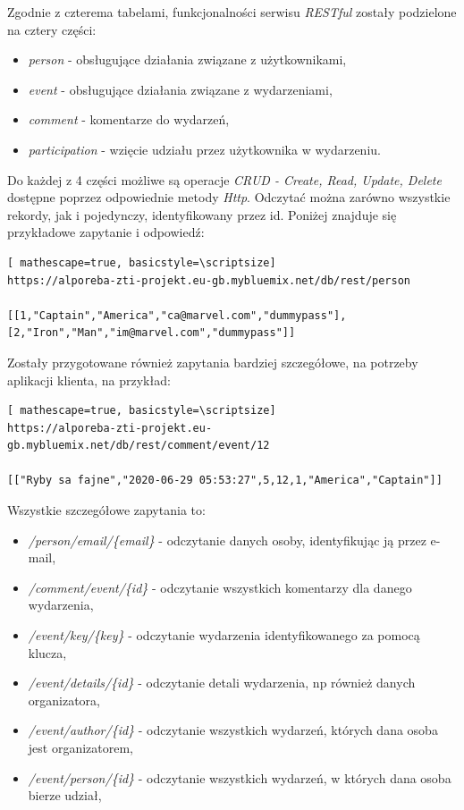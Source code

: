 \documentclass[12pt]{article}
\begin{document}
Zgodnie z czterema tabelami, funkcjonalności serwisu \textit{RESTful} zostały podzielone na cztery części: 
\begin{itemize}
\item \textit{person} - obsługujące działania związane z użytkownikami, 
\item \textit{event} - obsługujące działania związane z wydarzeniami, 
\item \textit{comment} - komentarze do wydarzeń,
\item \textit{participation} - wzięcie udziału przez użytkownika w wydarzeniu.
\end{itemize}

Do każdej z 4 części możliwe są operacje \textit{CRUD - Create, Read, Update, Delete} dostępne poprzez odpowiednie metody \textit{Http}. Odczytać można zarówno wszystkie rekordy, jak i pojedynczy, identyfikowany przez id. Poniżej znajduje się przykładowe zapytanie i odpowiedź:

\begin{lstlisting}[ mathescape=true, basicstyle=\scriptsize]
https://alporeba-zti-projekt.eu-gb.mybluemix.net/db/rest/person

[[1,"Captain","America","ca@marvel.com","dummypass"],[2,"Iron","Man","im@marvel.com","dummypass"]]
\end{lstlisting}

Zostały przygotowane również zapytania bardziej szczegółowe, na potrzeby aplikacji klienta, na przykład:

\begin{lstlisting}[ mathescape=true, basicstyle=\scriptsize]
https://alporeba-zti-projekt.eu-gb.mybluemix.net/db/rest/comment/event/12

[["Ryby sa fajne","2020-06-29 05:53:27",5,12,1,"America","Captain"]]
\end{lstlisting}

Wszystkie szczegółowe zapytania to:
\begin{itemize}
\item \textit{/person/email/\{email\}} - odczytanie danych osoby, identyfikując ją przez e-mail,
\item \textit{/comment/event/\{id\}} - odczytanie wszystkich komentarzy dla danego wydarzenia,
\item \textit{/event/key/\{key\}} - odczytanie wydarzenia identyfikowanego za pomocą klucza,
\item \textit{/event/details/\{id\}} - odczytanie detali wydarzenia, np również danych organizatora,
\item \textit{/event/author/\{id\}} - odczytanie wszystkich wydarzeń, których dana osoba jest organizatorem,
\item \textit{/event/person/\{id\}} - odczytanie wszystkich wydarzeń, w których dana osoba bierze udział,
\end{itemize}
\end{document}

